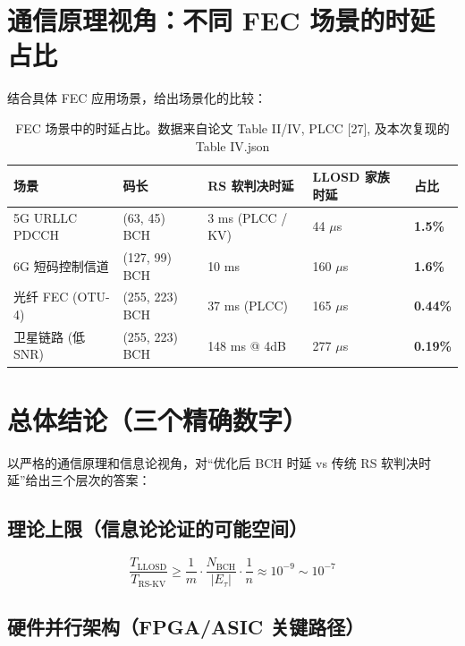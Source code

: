 \documentclass[11pt,a4paper]{article}
\begin{document}
\section{通信原理视角：不同 FEC 场景的时延占比}

结合具体 FEC 应用场景，给出场景化的比较：

\begin{table}[h!]
\centering
\begin{tabularx}{\textwidth}{Xllll}
\toprule
\textbf{场景} & \textbf{码长} & \textbf{RS 软判决时延} & \textbf{LLOSD 家族时延} & \textbf{占比} \\
\midrule
5G URLLC PDCCH & (63, 45) BCH & 3 ms (PLCC / KV) & 44 $\mu$s & \textbf{1.5\%} \\
6G 短码控制信道 & (127, 99) BCH & 10 ms & 160 $\mu$s & \textbf{1.6\%} \\
光纤 FEC (OTU-4) & (255, 223) BCH & 37 ms (PLCC) & 165 $\mu$s & \textbf{0.44\%} \\
卫星链路 (低 SNR) & (255, 223) BCH & 148 ms @ 4dB & 277 $\mu$s & \textbf{0.19\%} \\
\bottomrule
\end{tabularx}
\caption{FEC 场景中的时延占比。数据来自论文 Table II/IV, PLCC [27], 及本次复现的 Table IV.json}
\end{table}

\section{总体结论（三个精确数字）}

以严格的通信原理和信息论视角，对``优化后 BCH 时延 vs 传统 RS 软判决时延''给出三个层次的答案：

\subsection{理论上限（信息论论证的可能空间）}

\begin{equation}
\boxed{\frac{T_{\text{LLOSD}}}{T_{\text{RS-KV}}}
\geq \frac{1}{m}\cdot \frac{N_{\text{BCH}}}{|E_\tau|}\cdot \frac{1}{n}
\approx 10^{-9} \sim 10^{-7}}
\end{equation}

\subsection{硬件并行架构（FPGA/ASIC 关键路径）}
\end{document}
